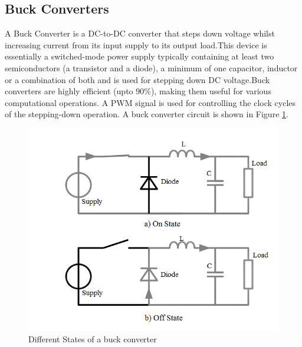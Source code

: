 \subsection{Buck Converters}
A Buck Converter \cite{RefJ12} is a DC-to-DC converter that steps down voltage whilst increasing current from its input supply to its output load.This device is essentially a switched-mode power supply typically containing at least two semiconductors (a transistor and a diode), a minimum of one capacitor, inductor or a combination of both and is used for stepping down DC voltage.Buck converters are highly efficient (upto 90\%), making them useful for various computational operations. A PWM signal is used for controlling the clock cycles of the stepping-down operation. A buck converter circuit is shown in Figure \ref{Figure:4}.
\begin{center}
\begin{figure}
\includegraphics[width=12cm,keepaspectratio]{4.png}
\caption{Different States of a buck converter \cite{RefJ12}}
\label{Figure:4}    
\end{figure}
\end{center}
